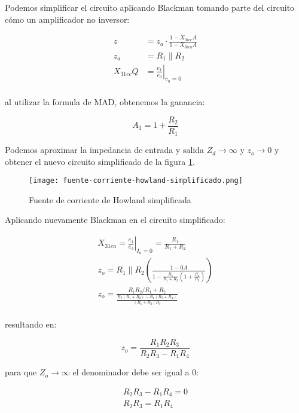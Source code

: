 Podemos simplificar el circuito aplicando Blackman tomando parte del circuito cómo un amplificador no inversor:

\begin{align*}
    z & = z_a \cdot \frac{1 - X_{3icc}A}{1 - X_{3ica}A} \\
    z_a & = R_1 \parallel R_2 \\
    X_{31cc} Q& = \left. \frac{e_1}{e_3} \right|_{v_a=0} \\
\end{align*}

al utilizar la formula de MAD, obtenemos la ganancia:

\begin{equation}
    A_1 = 1 + \frac{R_2}{R_1}
\end{equation}

Podemos aproximar la impedancia de entrada y salida $Z_d \rightarrow \infty $ y $z_o \rightarrow 0$ y obtener el nuevo circuito simplificado de la figura \ref{fig:mt-fuente-corriente-howland-simplificado}.

\begin{figure}[ht]
    \centering
    \texttt{[image: fuente-corriente-howland-simplificado.png]}
    \caption{Fuente de corriente de Howland simplificada}
    \label{fig:mt-fuente-corriente-howland-simplificado}    
\end{figure}

Aplicando nuevamente Blackman en el circuito simplificado:

\begin{align*}
    X_{31ca} = \left. \frac{e_1}{e_3} \right|_{I_a=0} = \frac{R_1}{R_1 + R_2} \\
    z_o = R_1 \parallel R_2 (\frac{1 - 0A}{1 - \frac{R_1}{R_1 + R_2}(1 + \frac{R_4}{R_3})}) \\
    z_o = \frac{R_1 R_2 / R_1 + R_2}{\frac{R_3(R_1 + R_2) - R_1(R_3 + R_4)}{(R_1 + R_2)R_3}} \\
\end{align*}

resultando en:

\begin{equation}
    z_o = \frac{R_1 R_2 R_3}{R_2 R_3 - R_1 R_4}
\end{equation}

para que $Z_o \rightarrow\infty$ el denominador debe ser igual a 0:

\begin{align*}
    R_2 R_3 - R_1 R_4 = 0 \\
    R_2 R_3 = R_1 R_4
\end{align*}

